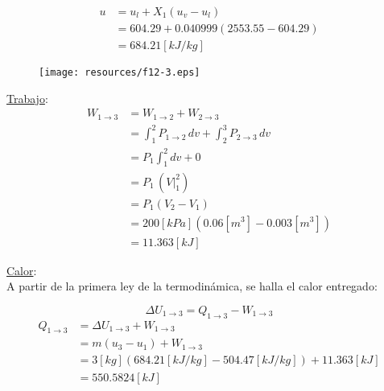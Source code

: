 \documentclass[letter,11pt]{article}
\begin{document}
\begin{enumerate}
\begin{equation*}
    \begin{split}
        u &= u_l + X_1(u_v - u_l) \\
          &= 604.29 + 0.040999 (2553.55 - 604.29) \\
          &= 684.21[kJ/kg]
    \end{split}
\end{equation*}

\begin{figure}[H]
\centering
\texttt{[image: resources/f12-3.eps]}
\end{figure}

\underline{Trabajo}: \\
\begin{equation*}
    \begin{split}
    W_{1\rightarrow 3} &= W_{1\rightarrow 2} + W_{2\rightarrow 3} \\
                       &= \int_1^2 P_{1\rightarrow 2}\,dv
                          + \int_2^3 P_{2\rightarrow 3}\,dv \\
                       &= P_1 \int_1^2 dv + 0 \\
                       &= P_1\,(V\Biggr|_1^2) \\
                       &= P_1(V_2-V_1) \\
                       &= 200[kPa](0.06[m^3]-0.003[m^3]) \\
                       &= 11.363[kJ]
    \end{split}
\end{equation*}

\underline{Calor}: \\
A partir de la primera ley de la termodinámica, se halla el calor entregado:

\begin{equation*}
    \Delta U_{1\rightarrow 3} = Q_{1\rightarrow 3} - W_{1\rightarrow 3}
\end{equation*}
\begin{equation*}
    \begin{split}
        Q_{1\rightarrow 3} &= \Delta U_{1\rightarrow 3} + W_{1\rightarrow 3} \\
                           &= m(u_3 - u_1) + W_{1\rightarrow 3} \\
                           &= 3[kg](684.21[kJ/kg]
                              -504.47[kJ/kg])+11.363[kJ] \\
                           &= 550.5824[kJ]
    \end{split}
\end{equation*}


\end{enumerate}
\end{document}
